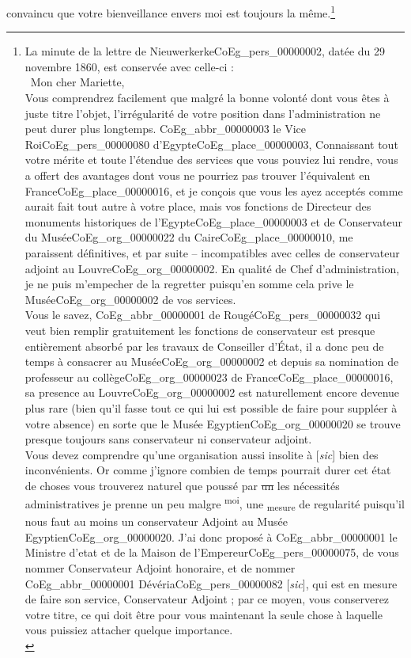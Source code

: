 \documentclass{book}
\begin{document}
convaincu que votre bienveillance envers moi est toujours la même.\footnote{La minute de la lettre de Nieuwerkerke\gls{CoEg_pers_00000002}, datée du 29 novembre 1860, est conservée avec celle-ci :\\
\indent \og ~Mon cher Mariette,\\
\indent Vous comprendrez facilement que malgré la bonne volonté dont vous êtes à juste titre l’objet, l’irrégularité de votre position dans l’administration ne peut durer plus longtemps. \gls{CoEg_abbr_00000003} le Vice Roi\gls{CoEg_pers_00000080} d’Egypte\gls{CoEg_place_00000003}, Connaissant tout votre mérite et toute l’étendue des services que vous pouviez lui rendre, vous a offert des avantages dont vous ne pourriez pas trouver l’équivalent en France\gls{CoEg_place_00000016}, et je conçois que vous les ayez acceptés comme aurait fait tout autre à votre place, mais vos fonctions de Directeur des monuments historiques de l’Egypte\gls{CoEg_place_00000003} et de Conservateur du Musée\gls{CoEg_org_00000022} du Caire\gls{CoEg_place_00000010}, me paraissent définitives, et par suite – incompatibles avec celles de conservateur adjoint au Louvre\gls{CoEg_org_00000002}. En qualité de Chef d’administration, je ne puis m’empecher de la regretter puisqu’en somme cela prive le Musée\gls{CoEg_org_00000002} de vos services.\\
\indent Vous le savez, \gls{CoEg_abbr_00000001} de Rougé\gls{CoEg_pers_00000032} qui veut bien remplir gratuitement les fonctions de conservateur est presque entièrement absorbé par les travaux de Conseiller d’État, il a donc peu de temps à consacrer au Musée\gls{CoEg_org_00000002} et depuis sa nomination de professeur au collège\gls{CoEg_org_00000023} de France\gls{CoEg_place_00000016}, sa presence au Louvre\gls{CoEg_org_00000002} est naturellement encore devenue plus rare (bien qu’il fasse tout ce qui lui est possible de faire pour suppléer à votre absence) en sorte que le Musée Egyptien\gls{CoEg_org_00000020} se trouve presque toujours sans conservateur ni conservateur adjoint.\\
\indent Vous devez comprendre qu’une organisation aussi insolite à {[\textit{sic}]} bien des inconvénients. Or comme j’ignore combien de temps pourrait durer cet état de choses vous trouverez naturel que poussé par \sout{un} les nécessités administratives je prenne un peu malgre \textsuperscript{moi}, une \textsubscript{mesure} de regularité puisqu’il nous faut au moins un conservateur Adjoint au Musée Egyptien\gls{CoEg_org_00000020}. J’ai donc proposé à \gls{CoEg_abbr_00000001} le Ministre d’etat et de la Maison de l’Empereur\gls{CoEg_pers_00000075}, de vous nommer Conservateur Adjoint honoraire, et de nommer \gls{CoEg_abbr_00000001} Dévéria\gls{CoEg_pers_00000082} {[\textit{sic}]}, qui est en mesure de faire son service, Conservateur Adjoint ; par ce moyen, vous conserverez votre titre, ce qui doit être pour vous maintenant la seule chose à laquelle vous puissiez attacher quelque importance.\\
}
\end{document}
